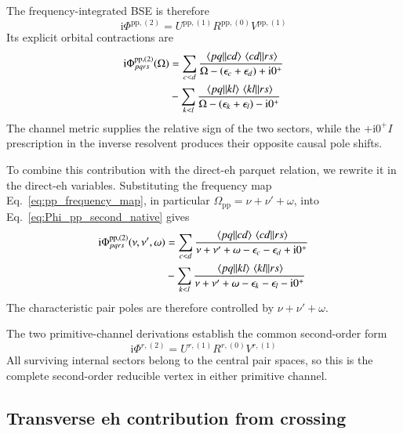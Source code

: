\documentclass[aip,jcp,reprint,noshowkeys,superscriptaddress]{revtex4-1}
\newcommand{\eps}{\epsilon}
\newcommand{\ii}{\mathrm{i}}
\newcommand{\eh}{\text{eh}}
\newcommand{\pp}{\text{pp}}
\begin{document}
The frequency-integrated BSE is therefore
\begin{equation}
	\ii\Phi^{\pp,(2)}
	=
	U^{\pp,(1)}R^{\pp,(0)}V^{\pp,(1)}
	\label{eq:Phi_pp_second_resolvent}
\end{equation}
Its explicit orbital contractions are
\begin{equation}
	\begin{split}
	\ii\Phi_{pqrs}^{\pp,(2)}(\Omega)
	&=
	\sum_{c<d}
	\frac{
	\mel{pq}{}{cd}
	\mel{cd}{}{rs}
	}
	{\Omega-(\eps_c+\eps_d)+\ii0^+}
	\\
	&-
	\sum_{k<l}
	\frac{
	\mel{pq}{}{kl}
	\mel{kl}{}{rs}
	}
	{\Omega-(\eps_k+\eps_l)-\ii0^+}
	\end{split}
	\label{eq:Phi_pp_second_native}
\end{equation}
The channel metric supplies the relative sign of the two sectors,
while the $+\ii0^+I$ prescription in the inverse resolvent
produces their opposite causal pole shifts.

To combine this contribution with the direct-$\eh$ parquet relation, we
rewrite it in the direct-$\eh$ variables.
Substituting the frequency map Eq.~\eqref{eq:pp_frequency_map}, in
particular $\Omega_\pp=\nu+\nu'+\omega$, into
Eq.~\eqref{eq:Phi_pp_second_native} gives
\begin{equation}
	\begin{split}
	\ii\Phi^{\pp,(2)}_{pqrs}(\nu,\nu',\omega)
	&=
	\sum_{c<d}
	\frac{
	\mel{pq}{}{cd}
	\mel{cd}{}{rs}
	}
	{\nu+\nu'+\omega-\eps_c-\eps_d+\ii0^+}
	\\
	&-
	\sum_{k<l}
	\frac{
	\mel{pq}{}{kl}
	\mel{kl}{}{rs}
	}
	{\nu+\nu'+\omega-\eps_k-\eps_l-\ii0^+}
	\end{split}
	\label{eq:Phi_pp_second_eh}
\end{equation}
The characteristic pair poles are therefore controlled by
$\nu+\nu'+\omega$.


The two primitive-channel derivations establish the common second-order form
\begin{equation}
    \ii\Phi^{r,(2)}=U^{r,(1)}R^{r,(0)}V^{r,(1)}
    \label{eq:target_second_order}
\end{equation}
All surviving internal sectors belong to the central pair spaces, so this
is the complete second-order reducible vertex in either primitive channel.

\subsection{Transverse eh contribution from crossing}\label{sec:crossing}
\end{document}
